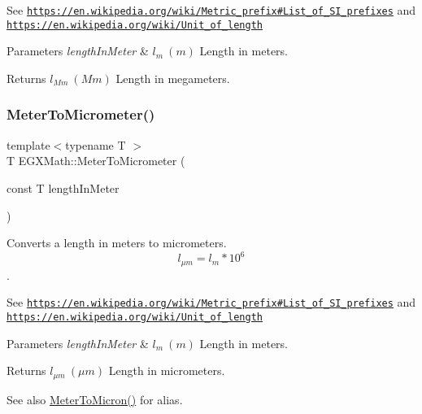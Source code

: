 See \href{https://en.wikipedia.org/wiki/Metric_prefix#List_of_SI_prefixes}{\tt https\+://en.\+wikipedia.\+org/wiki/\+Metric\+\_\+prefix\#\+List\+\_\+of\+\_\+\+S\+I\+\_\+prefixes} and \href{https://en.wikipedia.org/wiki/Unit_of_length}{\tt https\+://en.\+wikipedia.\+org/wiki/\+Unit\+\_\+of\+\_\+length} 
\begin{DoxyParams}{Parameters}
{\em length\+In\+Meter} & $ l_{m}\ (m)$ Length in meters. \\
\hline
\end{DoxyParams}
\begin{DoxyReturn}{Returns}
$ l_{Mm}\ (Mm)$ Length in megameters. 
\end{DoxyReturn}
\mbox{\label{group___e_g_x_math-_conversions-_length_conversions-_s_i-_meter-_s_i_gac0114c26af780ce603948df83f5e338e}} 
\subsubsection{\texorpdfstring{Meter\+To\+Micrometer()}{MeterToMicrometer()}}
{\footnotesize\ttfamily template$<$typename T $>$ \\
T E\+G\+X\+Math\+::\+Meter\+To\+Micrometer (\begin{DoxyParamCaption}\item[{const T}]{length\+In\+Meter }\end{DoxyParamCaption})}



Converts a length in meters to micrometers. \[ l_{\mu m}=l_{m} * 10^{6} \]. 

See \href{https://en.wikipedia.org/wiki/Metric_prefix#List_of_SI_prefixes}{\tt https\+://en.\+wikipedia.\+org/wiki/\+Metric\+\_\+prefix\#\+List\+\_\+of\+\_\+\+S\+I\+\_\+prefixes} and \href{https://en.wikipedia.org/wiki/Unit_of_length}{\tt https\+://en.\+wikipedia.\+org/wiki/\+Unit\+\_\+of\+\_\+length} 
\begin{DoxyParams}{Parameters}
{\em length\+In\+Meter} & $ l_{m}\ (m)$ Length in meters. \\
\hline
\end{DoxyParams}
\begin{DoxyReturn}{Returns}
$ l_{\mu m}\ (\mu m)$ Length in micrometers. 
\end{DoxyReturn}
\begin{DoxySeeAlso}{See also}
\mbox{\hyperlink{group___e_g_x_math-_conversions-_length_conversions-_s_i-_meter-_non-_s_i_ga9655833d43ede59b17c54a6f06f9681a}{Meter\+To\+Micron()}} for alias. 
\end{DoxySeeAlso}
\mbox{\label{group___e_g_x_math-_conversions-_length_conversions-_s_i-_meter-_s_i_ga9bd519d9f6b1a52f85e7817f4f81690b}} 
